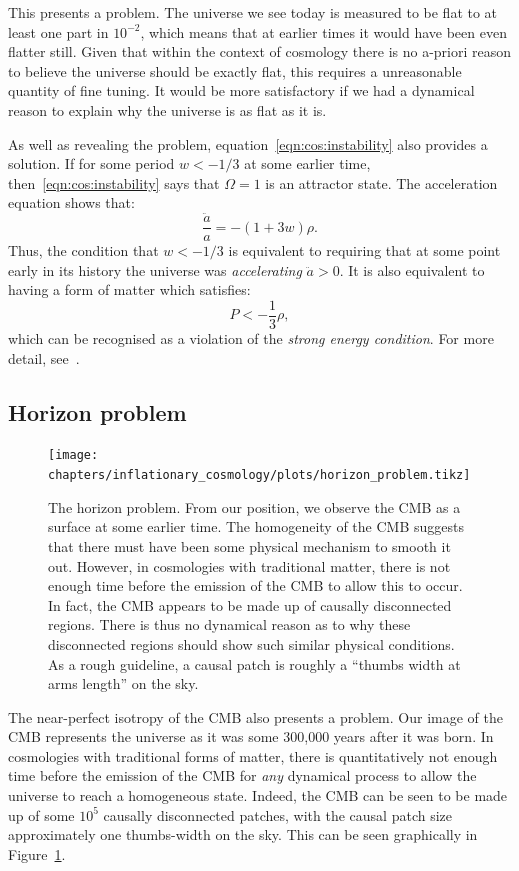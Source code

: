 This presents a problem. The universe we see today is measured to be flat to at least one part in \(10^{-2}\), which means that at earlier times it would have been even flatter still. Given that within the context of cosmology there is no a-priori reason to believe the universe should be exactly flat, this requires a unreasonable quantity of fine tuning. It would be more satisfactory if we had a dynamical reason to explain why the universe is as flat as it is.

As well as revealing the problem, equation~\eqref{eqn:cos:instability} also provides a solution. If for some period \(w<-1/3\) at some earlier time, then~\eqref{eqn:cos:instability} says that \(\Omega=1\) is an attractor state. The acceleration equation shows that:
\begin{equation}
  \frac{\ddot{a}}{a} = -(1+3w)\rho.
  \label{eqn:cos:Raychaudhuri_acc}
\end{equation}
Thus, the condition that \(w<-1/3\) is equivalent to requiring that at some point early in its history the universe was {\em accelerating\/} \(\ddot{a}>0\). It is also equivalent to having a form of matter which satisfies:
\begin{equation}
  P < -\frac{1}{3}\rho,
  \label{eqn:cos:SEC_violation}
\end{equation}
which can be recognised as a violation of the {\em strong energy condition}. For more detail, see~\cite{SEC_violation}.

\subsection{Horizon problem}
\begin{figure}[tp]
  \centering
  \texttt{[image: chapters/inflationary\_cosmology/plots/horizon\_problem.tikz]}
  \caption{The horizon problem. From our position, we observe the CMB as a surface at some earlier time. The homogeneity of the CMB suggests that there must have been some physical mechanism to smooth it out. However, in cosmologies with traditional matter, there is not enough time before the emission of the CMB to allow this to occur. In fact, the CMB appears to be made up of causally disconnected regions. There is thus no dynamical reason as to why these disconnected regions should show such similar physical conditions. As a rough guideline, a causal patch is roughly a ``thumbs width at arms length'' on the sky.}\label{fig:cos:horizon_problem}
\end{figure}
The near-perfect isotropy of the CMB also presents a problem. Our image of the CMB represents the universe as it was some 300,000 years after it was born. In cosmologies with traditional forms of matter, there is quantitatively not enough time before the emission of the CMB for {\em any\/} dynamical process to allow the universe to reach a homogeneous state. Indeed, the CMB can be seen to be made up of some \(10^{5}\) causally disconnected patches, with the causal patch size approximately one thumbs-width on the sky. This can be seen graphically in Figure~\ref{fig:cos:horizon_problem}.

